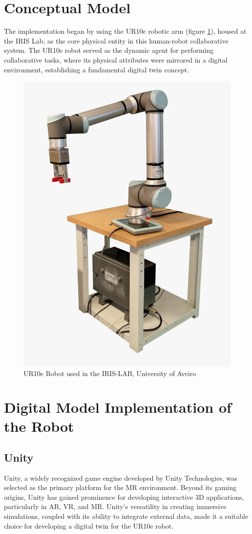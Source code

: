 \section{Conceptual Model}
The implementation began by using the UR10e robotic arm (figure \ref{f:ur10e_iris}), housed at the IRIS Lab, as the core physical entity in this human-robot collaborative system. The UR10e robot served as the dynamic agent for performing collaborative tasks, where its physical attributes were mirrored in a digital environment, establishing a fundamental digital twin concept.

\begin{figure}[h]
    \centering
    \includegraphics[width=0.4\linewidth]{figs/ur10e.jpeg}
    \caption{UR10e Robot used in the IRIS-LAB, University of Aveiro}
    \label{f:ur10e_iris}
\end{figure}

\section{Digital Model Implementation of the Robot}
\label{section:digital-model}

\subsection{Unity}
Unity, a widely recognized game engine developed by Unity Technologies, was selected as the primary platform for the \ac{MR} environment. Beyond its gaming origins, Unity has gained prominence for developing interactive 3D applications, particularly in \ac{AR}, \ac{VR}, and \ac{MR}. Unity's versatility in creating immersive simulations, coupled with its ability to integrate external data, made it a suitable choice for developing a digital twin for the UR10e robot.

